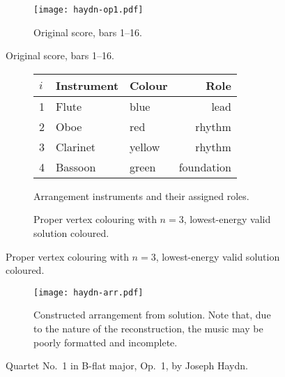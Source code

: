 \documentclass[12pt]{article}
\theoremstyle{definition}
\begin{document}
\begin{figure}[ht]
    \centering
    \begin{subfigure}{\textwidth}
        \texttt{[image: haydn-op1.pdf]}
        \caption{Original score, bars 1--16.}
    \end{subfigure}
\end{figure}
\begin{figure}[ht]
    \ContinuedFloat
    \centering
    \begin{subfigure}{\textwidth}
        \centering\setlength{\tabcolsep}{12pt}
        \begin{tabular}{lllr}
            \toprule
            $i$ & \textbf{Instrument} & \textbf{Colour} & \textbf{Role} \\
            \midrule
            1 & Flute & blue & lead \\
            2 & Oboe & red & rhythm \\
            3 & Clarinet & yellow & rhythm \\
            4 & Bassoon & green & foundation \\
            \bottomrule
        \end{tabular}
        \caption{Arrangement instruments and their assigned roles.}
    \end{subfigure}
    \begin{subfigure}{\textwidth}
        
        \caption{Proper vertex colouring with $n=3$, lowest-energy valid solution coloured.}
    \end{subfigure}
\end{figure}
\begin{figure}[ht]
    \ContinuedFloat
    \begin{subfigure}{\textwidth}
        \texttt{[image: haydn-arr.pdf]}
        \caption{Constructed arrangement from solution. Note that, due to the nature of the reconstruction, the music may be poorly formatted and incomplete.}
    \end{subfigure}
    \caption{Quartet No.\ 1 in B-flat major, Op.\ 1, by Joseph Haydn.}
\end{figure}
\end{document}
